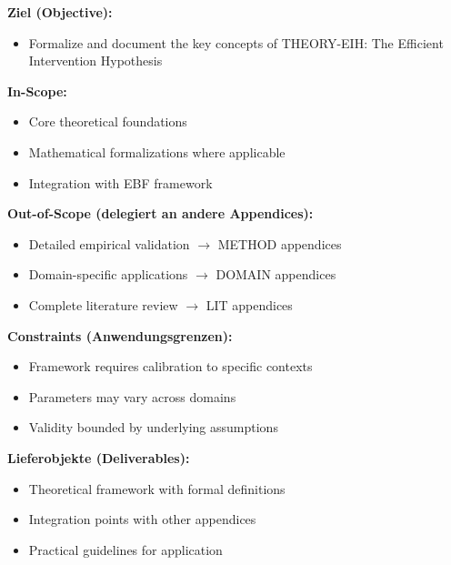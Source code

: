 \begin{tcolorbox}[
    colback=orange!5!white,
    colframe=orange!75!black,
    title={\textbf{Appendix Scope: Ziel / In-Scope / Out-of-Scope / Constraints}},
    fonttitle=\bfseries
]

\textbf{Ziel (Objective):}
\begin{itemize}[nosep]
    \item Formalize and document the key concepts of THEORY-EIH: The Efficient Intervention Hypothesis
\end{itemize}

\textbf{In-Scope:}
\begin{itemize}[nosep]
    \item Core theoretical foundations
    \item Mathematical formalizations where applicable
    \item Integration with EBF framework
\end{itemize}

\textbf{Out-of-Scope (delegiert an andere Appendices):}
\begin{itemize}[nosep]
    \item Detailed empirical validation $\rightarrow$ METHOD appendices
    \item Domain-specific applications $\rightarrow$ DOMAIN appendices
    \item Complete literature review $\rightarrow$ LIT appendices
\end{itemize}

\textbf{Constraints (Anwendungsgrenzen):}
\begin{itemize}[nosep]
    \item Framework requires calibration to specific contexts
    \item Parameters may vary across domains
    \item Validity bounded by underlying assumptions
\end{itemize}

\textbf{Lieferobjekte (Deliverables):}
\begin{itemize}[nosep]
    \item Theoretical framework with formal definitions
    \item Integration points with other appendices
    \item Practical guidelines for application
\end{itemize}

\end{tcolorbox}

